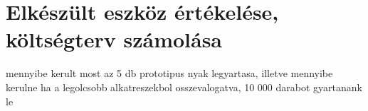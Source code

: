 \documentclass[../main.tex]{subfiles}
\begin{document}
\section{Elkészült eszköz értékelése, költségterv számolása}
    mennyibe kerult most az 5 db prototipus nyak legyartasa, illetve mennyibe kerulne ha a legolcsobb alkatreszekbol osszevalogatva, 10 000 darabot gyartanank le
\end{document}
